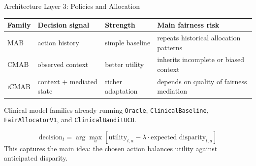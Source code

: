 \documentclass[aspectratio=169,10pt]{beamer}
\newcommand{\mab}{\textsc{MAB}}
\newcommand{\cmab}{\textsc{CMAB}}
\newcommand{\icmab}{\textsc{iCMAB}}
\begin{document}
\begin{frame}{Architecture Layer 3: Policies and Allocation}
\begin{center}
\begin{tabular}{p{}p{}p{}p{}}
\toprule
Family & Decision signal & Strength & Main fairness risk \\
\midrule
\mab & action history & simple baseline & repeats historical allocation patterns \\
\cmab & observed context & better utility & inherits incomplete or biased context \\
\icmab & context + mediated state & richer adaptation & depends on quality of fairness mediation \\
\bottomrule
\end{tabular}
\end{center}

\vspace{0.5em}
\begin{block}{Clinical model families already running}
\texttt{Oracle}, \texttt{ClinicalBaseline}, \texttt{FairAllocatorV1}, and \texttt{ClinicalBanditUCB}.
\end{block}
\begin{equation*}
\text{decision}_t = \arg\max_a \left[\text{utility}_{t,a} - \lambda \cdot \text{expected disparity}_{t,a}\right]
\end{equation*}
\small This captures the main idea: the chosen action balances utility against anticipated disparity.
\end{frame}
\end{document}
